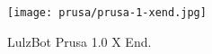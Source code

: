 
\begin{figure}[h!]
\texttt{[image: prusa/prusa-1-xend.jpg]}
 \caption{LulzBot Prusa 1.0 X End.}
 \label{fig:prusa-1-xend}
\end{figure}

